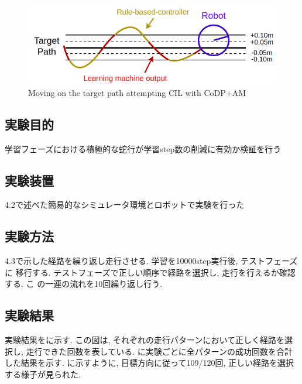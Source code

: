 \begin{figure}[hbtp]
  \centering
 \includegraphics[keepaspectratio, scale=0.58]
      {images/act1.5.png}
 \caption{Moving on the target path attempting CIL with CoDP+AM}
 \label{Fig:act1.5}
\end{figure}


  \subsection{実験目的}
  学習フェーズにおける積極的な蛇行が学習step数の削減に有効か検証を行う
  \subsection{実験装置}
  4.2で述べた簡易的なシミュレータ環境とロボットで実験を行った
  \subsection{実験方法}
  4.3で示した経路を繰り返し走行させる. 学習を10000step実行後, テストフェーズに
  移行する. テストフェーズで正しい順序で経路を選択し, 走行を行えるか確認する. こ
  の一連の流れを10回繰り返し行う.
  \subsection{実験結果}
  実験結果をに示す. この図は, それぞれの走行パターンにおいて正しく経路を選択し, 走行できた回数を表している. に実験ごとに全パターンの成功回数を合計した結果を示す. 
  に示すように, 目標方向に従って109/120回, 正しい経路を選択する様子が見られた. 

